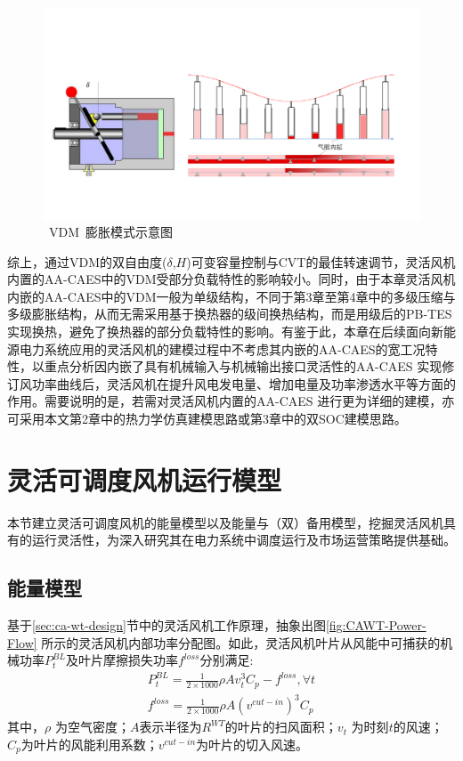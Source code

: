 \begin{figure}[H] %
  \centering
  \includegraphics[scale=0.45]{figures/Chap5-12-VDM-Expan.pdf}
  \caption{~VDM~膨胀模式示意图}
  \label{fig:chap5-cawt-vdm-expan}
\end{figure}

综上，通过VDM的双自由度($\delta$,$H$)可变容量控制与CVT的最佳转速调节，灵活风机内置的AA-CAES中的VDM受部分负载特性的影响较小。同时，由于本章灵活风机内嵌的AA-CAES中的VDM一般为单级结构，不同于第3章至第4章中的多级压缩与多级膨胀结构，从而无需采用基于换热器的级间换热结构，而是用级后的PB-TES实现换热，避免了换热器的部分负载特性的影响。有鉴于此，本章在后续面向新能源电力系统应用的灵活风机的建模过程中不考虑其内嵌的AA-CAES的宽工况特性，以重点分析因内嵌了具有机械输入与机械输出接口灵活性的AA-CAES 实现修订风功率曲线后，灵活风机在提升风电发电量、增加电量及功率渗透水平等方面的作用。需要说明的是，若需对灵活风机内置的AA-CAES 进行更为详细的建模，亦可采用本文第2章中的热力学仿真建模思路或第3章中的双SOC建模思路。

\section{灵活可调度风机运行模型}
\label{sec:ca-wt-model}
本节建立灵活可调度风机的能量模型以及能量与（双）备用模型，挖掘灵活风机具有的运行灵活性，为深入研究其在电力系统中调度运行及市场运营策略提供基础。

\subsection{能量模型}
\label{sec:ca-wt-model-energy}
基于\ref{sec:ca-wt-design}节中的灵活风机工作原理，抽象出图\ref{fig:CAWT-Power-Flow} 所示的灵活风机内部功率分配图。如此，灵活风机叶片从风能中可捕获的机械功率$P_t^{BL}$及叶片摩擦损失功率$ {f^{loss}}$分别满足:
\begin{subequations}
\label{eq:CA-WT-Wind-Blade-Energy}
\begin{gather}
P_t^{BL} = \frac{1}{{2 \times 1000}}\rho Av_t^3{C_p} - {f^{loss}},\forall t\\
{f^{loss}} = \frac{1}{{2 \times 1000}}\rho A{({{v^{cut - in}}})^3}{C_p}
\end{gather}
\end{subequations}
其中，$\rho $ 为空气密度；$A$表示半径为${R^{WT}}$的叶片的扫风面积；$v_t$ 为时刻$t$的风速；$C_p$为叶片的风能利用系数；$v^{cut-in}$为叶片的切入风速。

